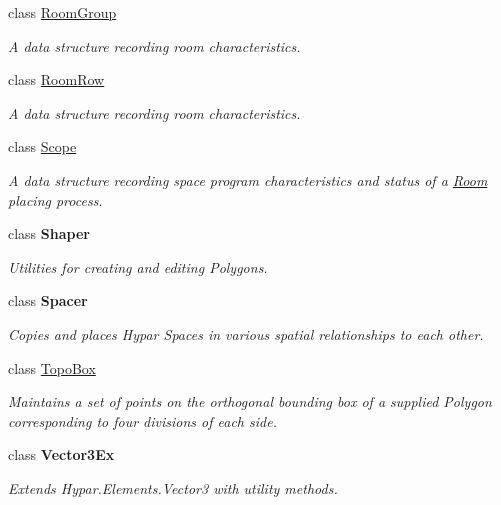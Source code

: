 \begin{DoxyCompactItemize}
class \mbox{\hyperlink{class_room_kit_1_1_room_group}{Room\+Group}}
\begin{DoxyCompactList}\small\item\em A data structure recording room characteristics. \end{DoxyCompactList}\item 
class \mbox{\hyperlink{class_room_kit_1_1_room_row}{Room\+Row}}
\begin{DoxyCompactList}\small\item\em A data structure recording room characteristics. \end{DoxyCompactList}\item 
class \mbox{\hyperlink{class_room_kit_1_1_scope}{Scope}}
\begin{DoxyCompactList}\small\item\em A data structure recording space program characteristics and status of a \mbox{\hyperlink{class_room_kit_1_1_room}{Room}} placing process. \end{DoxyCompactList}\item 
class {\bfseries Shaper}
\begin{DoxyCompactList}\small\item\em Utilities for creating and editing Polygons. \end{DoxyCompactList}\item 
class {\bfseries Spacer}
\begin{DoxyCompactList}\small\item\em Copies and places Hypar Spaces in various spatial relationships to each other. \end{DoxyCompactList}\item 
class \mbox{\hyperlink{class_room_kit_1_1_topo_box}{Topo\+Box}}
\begin{DoxyCompactList}\small\item\em Maintains a set of points on the orthogonal bounding box of a supplied Polygon corresponding to four divisions of each side. \end{DoxyCompactList}\item 
class {\bfseries Vector3\+Ex}
\begin{DoxyCompactList}\small\item\em Extends Hypar.\+Elements.\+Vector3 with utility methods. \end{DoxyCompactList}\end{DoxyCompactItemize}
